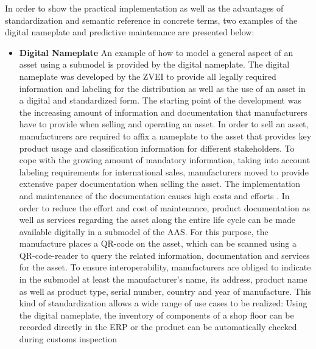 In order to show the practical implementation as well as the advantages of standardization and semantic reference in concrete terms, two examples of the digital nameplate and predictive maintenance are presented below:

\begin{itemize}

    \item [] \textbf{Digital Nameplate} An example of how to model a general aspect of an asset using a submodel is provided by the digital nameplate. The digital nameplate was developed by the \ac{ZVEI} to provide all legally required information and labeling for the distribution as well as the use of an asset in a digital and standardized form. The starting point of the development was the increasing amount of information and documentation that manufacturers have to provide when selling and operating an asset. In order to sell an asset, manufacturers are required to affix a nameplate to the asset that provides key product usage and classification information for different stakeholders. To cope with the growing amount of mandatory information, taking into account labeling requirements for international sales, manufacturers moved to provide extensive paper documentation when selling the asset. The implementation and maintenance of the documentation causes high costs and efforts \cite[p. 1]{ZVEI2020DasVernetzt}. In order to reduce the effort and cost of maintenance, product documentation as well as services regarding the asset along the entire life cycle can be made available digitally in a submodel of the \ac{AAS}. For this purpose, the manufacture places a QR-code on the asset, which can be scanned using a QR-code-reader to query the related information, documentation and services for the asset. To ensure interoperability, manufacturers are obliged to indicate in the submodel at least the manufacturer's name, its address, product name as well as product type, serial number, country and year of manufacture. This kind of standardization allows a wide range of use cases to be realized: Using the digital nameplate, the inventory of components of a shop floor can be recorded directly in the \ac{ERP} or the product can be automatically checked during customs inspection \cite[p. 4]{ZVEI2020DasVernetzt}
    

\end{itemize}
